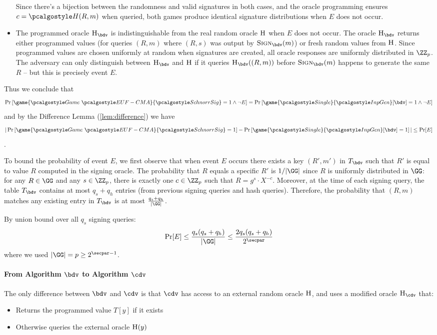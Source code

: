 \begin{mysolution}
\begin{itemize}
    Since there's a bijection between the randomness and valid signatures in both cases, and the oracle programming ensures $c = \algo{H}(R, m)$ when
  queried, both games produce identical signature distributions when $E$ does not occur.
  \item The programmed oracle $\pcoracle{H}_{\bdv}$ is indistinguishable from the real random oracle ${\normalfont\textsc{H}}$ when $E$ does not occur. The oracle
  $\pcoracle{H}_{\bdv}$ returns either programmed values (for queries $(R, m)$ where $(R, s)$ was output by $\pcoracle{Sign}_{\bdv}(m)$) or fresh random
  values from ${\normalfont\textsc{H}}$. Since programmed values are chosen uniformly at random when signatures are created, all oracle responses are uniformly
  distributed in $\ZZ_p$. The adversary can only distinguish between $\pcoracle{H}_{\bdv}$ and ${\normalfont\textsc{H}}$ if it queries $\pcoracle{H}_{\bdv}((R, m))$
  before $\pcoracle{Sign}_{\bdv}(m)$ happens to generate the same $R$ – but this is precisely event $E$.
  \end{itemize}

  Thus we conclude that
  \[
    \pr{\game{\Game~\algo{EUF-CMA}}{\algo{SchnorrSig}} = 1 \wedge \neg E} =  \pr{\game{\algo{Single}}{\algo{InpGen}}[\bdv] = 1 \wedge \neg E}
  \] and by the Difference Lemma (\autoref{lem:difference}) we have
  \[
    |\pr{\game{\Game~\algo{EUF-CMA}}{\algo{SchnorrSig}} = 1} - \pr{\game{\algo{Single}}{\algo{InpGen}}[\bdv] = 1}| \leq \Pr[E]
  \].

  To bound the probability of event $E$, we first observe that when event $E$ occurs there exists a key $(R', m')$ in $T_{\bdv}$ such that $R'$ is equal to value $R$ computed in the signing oracle.
  The probability that $R$ equals a specific $R'$ is $1/|\GG|$ since $R$ is uniformly distributed in $\GG$: for any $R \in \GG$ and any $s \in \ZZ_p$, there is exactly one $c \in \ZZ_p$ such that $R = g^s \cdot X^{-c}$.
  Moreover, at the time of each signing query, the table $T_{\bdv}$ contains at most $q_s + q_h$ entries (from previous signing queries and hash queries).
  Therefore, the probability that $(R, m)$ matches any existing entry in $T_{\bdv}$ is at most $\frac{q_s + q_h}{|\GG|}$.

  By union bound over all $q_s$ signing queries:
  \[
    \Pr[E] \leq \frac{q_s(q_s + q_h)}{|\GG|} \leq \frac{2 q_s(q_s + q_h)}{2^\secpar}
  \]
  where we used $|\GG| = p \geq 2^{\secpar-1}$.

  \paragraph{From Algorithm $\bdv$ to Algorithm $\cdv$}
  The only difference between $\bdv$ and $\cdv$ is that $\cdv$ has access to an external random oracle ${\normalfont\textsc{H}}$, and uses a modified oracle $\pcoracle{H}_{\cdv}$ that:
  \begin{itemize}
    \item Returns the programmed value $T[y]$ if it exists
    \item Otherwise queries the external oracle ${\normalfont\textsc{H}}(y)$
  \end{itemize}


\end{mysolution}
